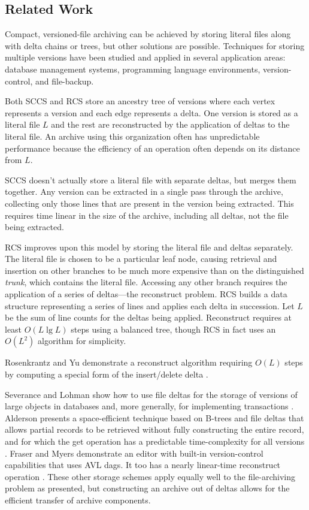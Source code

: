 \documentclass{llncs}
\begin{document}
\subsection{Related Work}

Compact, versioned-file archiving can be achieved by storing literal
files along with delta chains or trees, but other solutions are
possible.  Techniques for storing multiple versions have been studied
and applied in several application areas: database management systems,
programming language environments, version-control, and file-backup.

Both SCCS and RCS store an ancestry tree of versions where each vertex
represents a version and each edge represents a delta.  One version is
stored as a literal file $L$ and the rest are reconstructed by the
application of deltas to the literal file.  An archive using this
organization often has unpredictable performance because the
efficiency of an operation often depends on its distance from $L$.

SCCS doesn't actually store a literal file with separate deltas, but
merges them together.  Any version can be extracted in a single pass
through the archive, collecting only those lines that are present in
the version being extracted.  This requires time linear in the size of
the archive, including all deltas, not the file being extracted.

RCS improves upon this model by storing the literal file and deltas
separately.  The literal file is chosen to be a particular leaf node,
causing retrieval and insertion on other branches to be much more
expensive than on the distinguished \emph{trunk}, which contains the
literal file.  Accessing any other branch requires the application of
a series of deltas---the reconstruct problem.  RCS builds a data
structure representing a series of lines and applies each delta in
succession.  Let $L$ be the sum of line counts for the deltas being
applied.  Reconstruct requires at least $O(L \lg L)$ steps using a
balanced tree, though RCS in fact uses an $O(L^2)$ algorithm for
simplicity\cite{Yu:1994:LTS}.

Rosenkrantz and Yu demonstrate a reconstruct algorithm requiring
$O(L)$ steps by computing a special form of the insert/delete delta
\cite{Yu:1994:LTS}.

Severance and Lohman show how to use file deltas for the storage of
versions of large objects in databases and, more generally, for
implementing transactions \cite{Severance:1976:TODS}.  Alderson
presents a space-efficient technique based on B-trees and file deltas
that allows partial records to be retrieved without fully constructing
the entire record, and for which the get operation has a predictable
time-complexity for all versions \cite{Alderson:1988:JSE}.  Fraser and
Myers demonstrate an editor with built-in version-control capabilities
that uses AVL dags.  It too has a nearly linear-time reconstruct
operation \cite{Myers:Editor}.  These other storage schemes apply
equally well to the file-archiving problem as presented, but
constructing an archive out of deltas allows for the efficient
transfer of archive components.
\end{document}
